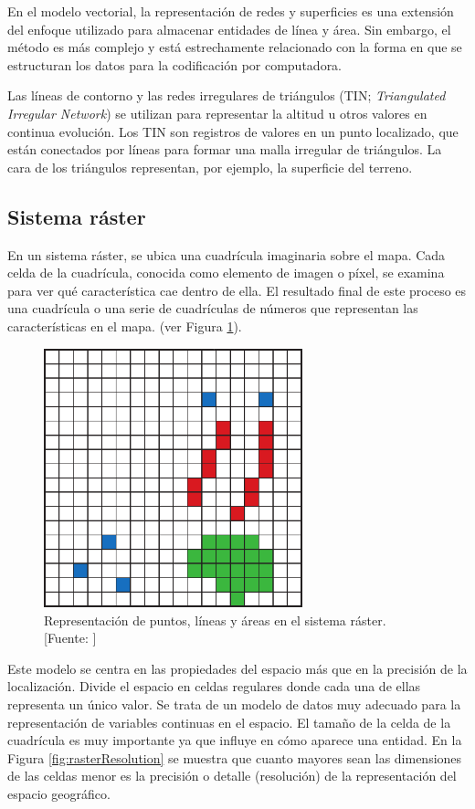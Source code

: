 En el modelo vectorial, la representación de redes y superficies es una extensión del enfoque utilizado para almacenar entidades de línea y área. Sin embargo, el método es más complejo y está estrechamente relacionado con la forma en que se estructuran los datos para la codificación por computadora.

Las líneas de contorno y las redes irregulares de triángulos (TIN; \textit{Triangulated Irregular Network}) se utilizan para representar la altitud u otros valores en continua evolución. Los TIN son registros de valores en un punto localizado, que están conectados por líneas para formar una malla irregular de triángulos. La cara de los triángulos representan, por ejemplo, la superficie del terreno.

\subsection{Sistema ráster}

En un sistema ráster, se ubica una cuadrícula imaginaria sobre el mapa. Cada celda de la cuadrícula, conocida como elemento de imagen o píxel, se examina para ver qué característica cae dentro de ella. El resultado final de este proceso es una cuadrícula o una serie de cuadrículas de números que representan las características en el mapa. (ver Figura \ref{fig:modeloRaster}).

\begin{figure}[H]
    \centering
    \includegraphics[width=7.5cm]{modeloRaster.png}
    \caption{Representación de puntos, líneas y áreas en el sistema ráster. [Fuente: ]}
    \label{fig:modeloRaster}
\end{figure}

Este modelo se centra en las propiedades del espacio más que en la precisión de la localización. Divide el espacio en celdas regulares donde cada una de ellas representa un único valor. Se trata de un modelo de datos muy adecuado para la representación de variables continuas en el espacio. El tamaño de la celda de la cuadrícula es muy importante ya que influye en cómo aparece una entidad. En la Figura \ref{fig:rasterResolution} se muestra que cuanto mayores sean las dimensiones de las celdas menor es la precisión o detalle (resolución) de la representación del espacio geográfico.

